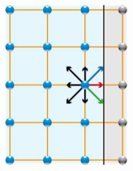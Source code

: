 \begin{figure}[H]
  \centering
  \begin{subfigure}[h]{0.3\textwidth}
    \includegraphics[width=\textwidth]{img/fig8-1.png}
  \end{subfigure}
  \begin{subfigure}[h]{0.3\textwidth}

\end{subfigure}
\end{figure}
